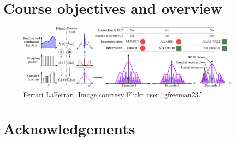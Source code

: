 \documentclass{acmsiggraph}
\begin{document}
\section{Course objectives and overview}
  

\begin{figure}[thbp]
  \centering
  \includegraphics[width=\linewidth]{../CourseNotes/Pictures/IntegRecons.pdf}
  \caption{Ferrari LaFerrari. Image courtesy Flickr user ``gfreeman23.''}
  \label{fig:ferrari}
\end{figure}


\section*{Acknowledgements}



\end{document}
